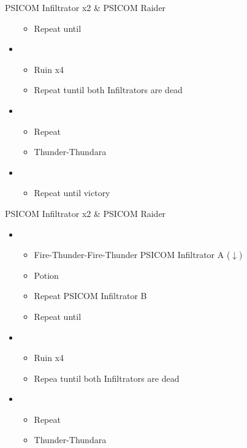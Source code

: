 \begin{paracol}{2}
\begin{battle}{PSICOM Infiltrator x2 \& PSICOM Raider}
\begin{itemize}
\begin{itemize}
				      \item Repeat until \stagger
			      \end{itemize}
			\item \fifth
			      \begin{itemize}
				      \item Ruin x4
				      \item Repeat tuntil both Infiltrators are dead
			      \end{itemize}
			\item \fourth
			      \begin{itemize}
				      \item Repeat
				      \item Thunder-Thundara
				            \stagger
			      \end{itemize}
			\item \fifth
			      \begin{itemize}
				      \item Repeat until victory
			      \end{itemize}
		\end{itemize}
		 
	\end{battle}
	\switchcolumn
	\begin{battle}{PSICOM Infiltrator x2 \& PSICOM Raider}
		\begin{itemize}
			\item \fourth
			      \begin{itemize}
				      \item Fire-Thunder-Fire-Thunder PSICOM Infiltrator A ($\downarrow$)
				      \item Potion
				      \item Repeat PSICOM Infiltrator B
				      \item Repeat until \stagger
			      \end{itemize}
			\item \fifth
			      \begin{itemize}
				      \item Ruin x4
				      \item Repea tuntil both Infiltrators are dead
			      \end{itemize}
			\item \fourth
			      \begin{itemize}
				      \item Repeat
				      \item Thunder-Thundara
				            \stagger
			      \end{itemize}

\end{itemize}
\end{battle}
\end{paracol}
